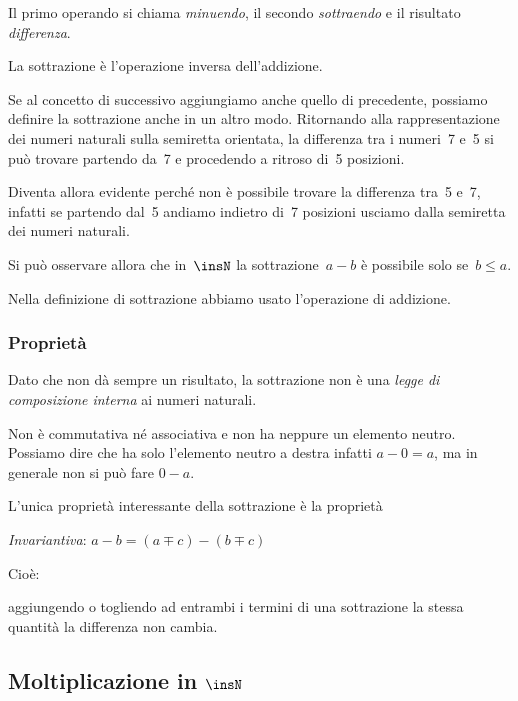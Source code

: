 Il primo operando si chiama \emph{minuendo}, il secondo \emph{sottraendo} e 
il risultato \emph{differenza}.

La sottrazione è l'operazione inversa dell'addizione.

Se al concetto di successivo aggiungiamo anche quello di precedente, 
possiamo definire la sottrazione anche in un altro modo.
Ritornando alla rappresentazione dei numeri naturali sulla semiretta 
orientata, la differenza tra i numeri~7 e~5 si può trovare partendo da~7 e 
procedendo a ritroso di~5 posizioni.

Diventa allora evidente perché non è possibile trovare la differenza 
tra~5 e~7, infatti se partendo dal~5 andiamo indietro di~7 posizioni 
usciamo dalla semiretta dei numeri naturali.

\begin{inaccessibleblock}

\end{inaccessibleblock}

Si può osservare allora che in~$\insN$ la sottrazione~$a - b$ è possibile 
solo se~$b\leq a$.

\osservazione Nella definizione di sottrazione abbiamo usato l'operazione 
di addizione.

\subsubsection{Proprietà}

Dato che non dà sempre un risultato, la sottrazione non è una 
\emph{legge di composizione interna} ai numeri naturali. 

Non è commutativa né associativa e non ha neppure un elemento neutro.
Possiamo dire che ha solo l'elemento neutro a destra infatti $a - 0 = a$, 
ma in generale non si può fare $0 - a$.

L'unica proprietà interessante della sottrazione è la proprietà 
\begin{itemize*}
 \item \emph{Invariantiva}: $a - b = (a \mp c) - (b \mp c)$
\end{itemize*}

Cioè: 
\begin{definizione}
aggiungendo o togliendo ad entrambi i termini di una sottrazione 
la stessa quantità la differenza non  cambia.
\end{definizione}

\subsection{Moltiplicazione in $\insN$}

